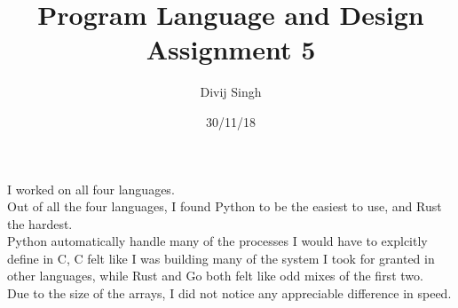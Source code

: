 \documentclass{article}
\title{Program Language and Design Assignment 5}
\author{Divij Singh}
\date{30/11/18}
\begin{document}
	\maketitle
	I worked on all four languages.\\
	Out of all the four languages, I found Python to be the easiest to use, and Rust the hardest.\\
	Python automatically handle many of the processes I would have to explcitly define in C, C felt like I was building many of the system I took for granted in other languages, while Rust and Go both felt like odd mixes of the first two.\\
Due to the size of the arrays, I did not notice any appreciable difference in speed.
\end{document}
